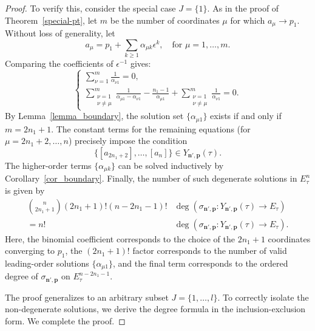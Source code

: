 \documentclass[10pt,a4paper]{amsart}
\begin{document}
\begin{proof}
To verify this, consider the special case $J=\{1\}$. As in the proof of Theorem~\ref{special-pt}, let $m$ be the number of coordinates $\mu$ for which $a_\mu \to p_1$. Without loss of generality, let 
\[
    a_\mu = p_1 + \sum_{k \ge 1} \alpha_{\mu k} \epsilon^k, \quad \text{for } \mu=1,\dots, m.
\]
Comparing the coefficients of $\epsilon^{-1}$ gives:
\[
\begin{cases}
    \displaystyle\sum_{\nu=1}^{m} \frac{1}{\alpha_{\nu 1}} = 0, \\[15pt]
    \displaystyle\sum_{\substack{\nu=1 \\ \nu \neq \mu}}^{m} \frac{1}{\alpha_{\mu 1} - \alpha_{\nu 1}} - \frac{n_1-1}{\alpha_{\mu 1}} + \sum_{\substack{\nu=1 \\ \nu \neq \mu}}^m \frac{1}{\alpha_{\nu 1}}  = 0.
\end{cases}
\]
By Lemma~\ref{lemma_boundary}, the solution set $\{ \alpha_{\mu 1} \}$ exists if and only if $m = 2n_1+1$. The constant terms for the remaining equations (for $\mu = 2n_1+2,\dots,n$) precisely impose the condition
\[
    \{[a_{2n_1+2}], \dots, [a_n]\} \in Y_{\mathbf{n}',\mathbf{p}}(\tau). 
\]
The higher-order terms $\{ \alpha_{\mu k} \}$ can be solved inductively by Corollary~\ref{cor_boundary}. Finally, the number of such degenerate solutions in $E_\tau^n$ is given by
\[
\begin{split}
    \binom{n}{2n_1+1} (2n_1+1)!  (n-2n_1-1)! & \deg ( \sigma_{\mathbf{n}',\mathbf{p}}: Y_{\mathbf{n}',\mathbf{p}}(\tau) \to E_\tau ) 
    \\
     = n! & \deg ( \sigma_{\mathbf{n}',\mathbf{p}}: Y_{\mathbf{n}',\mathbf{p}}(\tau) \to E_\tau ).
\end{split}
\]
Here, the binomial coefficient corresponds to the choice of the $2n_1+1$ coordinates converging to $p_1$, the $(2n_1+1)!$ factor corresponds to the number of valid leading-order solutions $\{ \alpha_{\mu 1} \}$, and the final term corresponds to the ordered degree of $\sigma_{\mathbf{n}',\mathbf{p}}$ on $E^{n-2n_1-1}_\tau$. 

The proof generalizes to an arbitrary subset $J = \{ 1,\dots,l \}$. To correctly isolate the non-degenerate solutions, we derive the degree formula in the inclusion-exclusion form. We complete the proof.
\end{proof}
\end{document}
